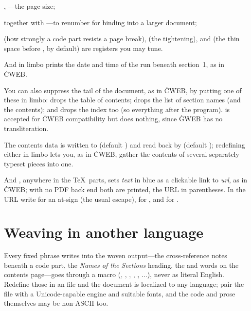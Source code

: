 \bull {}, ---the page size;

\bull {} together with
---to renumber for binding into a larger document;

\bull {} (how strongly a code part resists a page break),
 (the \cw{//} tightening), and  (the
thin space before \cw{(}, \cw{2mu} by default) are registers you may tune.

\noindent And  in limbo prints the date and time of the run
beneath section~1, as in \.{CWEB}.

You can also suppress the tail of the document, as in \.{CWEB}, by putting one of
these in limbo:  drops the table of contents;  drops
the list of section names (and the contents); and  drops the index
too (so everything after the program).  is accepted for \.{CWEB}
compatibility but does nothing, since \.{GWEB} has no  transliteration.

The contents data is written to  (default ) and read back by  (default ); redefining either in limbo lets you, as in \.{CWEB}, gather the
contents of several separately-typeset pieces into one.

And , anywhere in the
\TeX\ parts, sets {\it text\/} in blue as a clickable link to {\it url\/}, as in
\.{CWEB}; with no PDF back end both are printed, the URL in parentheses. In the
URL write  for an at-sign (the usual  escape),  for
, and  for .

\chapter{Weaving in another language}
\noindent Every fixed phrase  writes into the woven output---the
cross-reference notes beneath a code part, the {\it Names of the Sections\/}
heading, the  and  words on the contents page---goes through
a macro (, , , ,
, $\ldots$), never as literal English. Redefine those in an
 file and the document is localized to any language; pair the file
with a Unicode-capable engine and suitable fonts, and the code and prose themselves
may be non-ASCII too.

